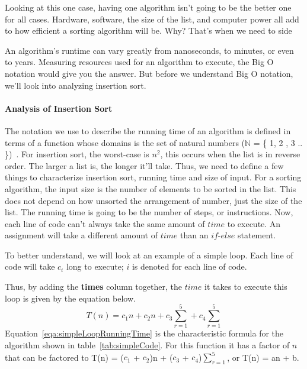 \documentclass[12pt]{article}
\begin{document}
	Looking at this one case, having one algorithm isn't going to be the better one for all cases.
	Hardware, software, the size of the list, and computer power all add to how efficient a sorting algorithm will be.
	Why? That's when we need to side 
	
	An algorithm's runtime can vary greatly from nanoseconds, to minutes, or even to years.	Measuring resources used for an algorithm to execute, the Big O notation would give you the answer.
	But before we understand Big O notation, we’ll look into analyzing insertion sort.
	
	
	\paragraph{Analysis of Insertion Sort}
	
	The notation we use to describe the running time of an algorithm is defined in terms of a function whose domains is the set of natural numbers ($\mathbb{N}$ = \{ 1, 2 , 3 .. \})~\cite[p.~43]{intro}.
	For insertion sort, the worst-case is $n^2$, this occurs when the list is in reverse order.
	The larger a list is, the longer it'll take.
	Thus, we need to define a few things to characterize insertion sort, running time and size of input.
	For a sorting algorithm, the input size is the number of elements to be sorted in the list.
	This does not depend on how unsorted the arrangement of number, just the size of the list.
	The running time is going to be the number of steps, or instructions.
	Now, each line of code can't always take the same amount of $\textit{time}$ to execute.
	An assignment will take a different amount of $\textit{time}$ than an $\textit{if-else}$ statement.
	
	To better understand, we will look at an example of a simple loop.
	Each line of code will take $c_i$ long to execute; $i$ is denoted for each line of code.
	
	Thus, by adding the \textbf{times} column together, the $\textit{time}$ it takes to execute this loop is given by the equation below.
	\begin{equation}
	T(n) = c_1n + c_2n + c_3\sum_{r=1}^{5} + c_4\sum_{r=1}^{5}
	\label{eqa:simpleLoopRunningTime}
	\end{equation}
	Equation~\ref{eqa:simpleLoopRunningTime} is the characteristic formula for the algorithm shown in table~\ref{tab:simpleCode}.
	For this function it has a factor of $n$ that can be factored to T(n) = ($c_1$ + $c_2$)n + ($c_3$ + $c_4$)$\sum_{r=1}^{5}$, or T(n) = an + b.
	
\end{document}
